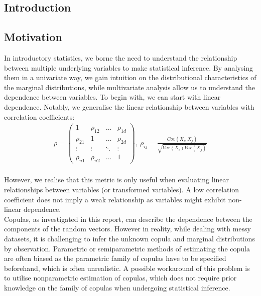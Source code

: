 \documentclass[12pt]{report}
\newcommand{\1}{\mathbf{1}}
\begin{document}
\newpage
\begin{flushleft}
\sectionfont{\fontsize{20}{15}\selectfont}
\subsectionfont{\fontsize{17}{15}\selectfont}
\section{Introduction}
\vspace{0.5cm}
\subsection{Motivation}
\vspace{0.5cm}
\normalsize
In introductory statistics, we borne the need to understand the relationship between multiple underlying variables to make statistical inference. By analysing them in a univariate way, we gain intuition on the distributional characteristics of the marginal distributions, while multivariate analysis allow us to understand the dependence between variables. To begin with, we can start with linear dependence. Notably, we generalise the linear relationship between variables with correlation coefficients: \\
\vspace{0.5cm}
\begin{align*}
\rho = \begin{pmatrix} 
    1 & \rho_{12} & \dots & \rho_{1d} \\
    \rho_{21} & 1 & \dots & \rho_{2d} \\
    \vdots & \vdots & \ddots & \vdots \\
    \rho_{n1} & \rho_{n2} & \dots & 1
\end{pmatrix}
, \: \rho_{ij} = \frac{Cov(X_{i},X_{j})}{\sqrt{Var(X_{i})Var(X_{j})}}
\end{align*} \\
\vspace{0.5cm}
However, we realise that this metric is only useful when evaluating linear relationships between variables (or transformed variables). A low correlation coefficient does not imply a weak relationship as variables might exhibit non-linear dependence. \\
\vspace{0.5cm}
Copulas, as investigated in this report, can describe the dependence between the components of the random vectors. However in reality, while dealing with messy datasets, it is challenging to infer the unknown copula and marginal distributions by observation. Parametric or semiparametric methods of estimating the copula are often biased as the parametric family of copulas have to be specified beforehand, which is often unrealistic. A possible workaround of this problem is to utilise nonparametric estimation of copulas, which does not require prior knowledge on the family of copulas when undergoing statistical inference. \\

\end{flushleft}
\end{document}
